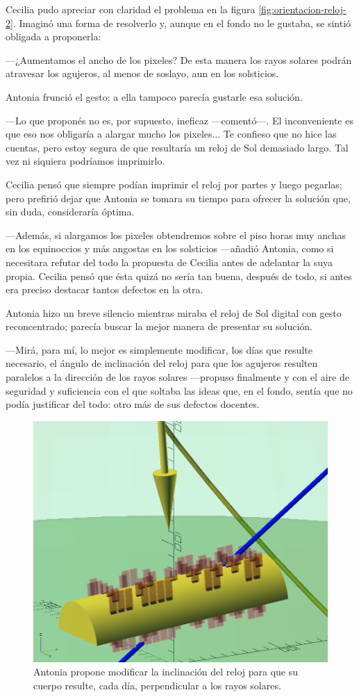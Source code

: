 Cecilia pudo apreciar con claridad el problema en la figura
\ref{fig:orientacion-reloj-2}. Imaginó una forma de resolverlo y, aunque
en el fondo no le gustaba, se sintió obligada a proponerla:

---¿Aumentamos el ancho de los pixeles? De esta manera los rayos
solares podrán atravesar los agujeros, al menos de soslayo, aun en los
solsticios.

Antonia frunció el gesto; a ella tampoco parecía gustarle esa
solución.

---Lo que proponés no es, por supuesto, ineficaz ---co\-men\-tó---. El
inconveniente es que eso nos obligaría a alargar mucho los
pixeles... Te confieso que no hice las cuentas, pero estoy segura de
que resultaría un reloj de Sol demasiado largo. Tal vez ni siquiera
podríamos imprimirlo.

Cecilia pensó que siempre podían imprimir el reloj por partes y luego
pegarlas; pero prefirió dejar que Antonia se tomara su tiempo para
ofrecer la solución que, sin duda, consideraría óptima.

---Además, si alargamos los pixeles obtendremos sobre el piso horas
muy anchas en los equinoccios y más angostas en los solsticios
---a\-ña\-dió Antonia, como si necesitara refutar del todo la
propuesta de Cecilia antes de adelantar la suya propia. Cecilia pensó
que ésta quizá no sería tan buena, después de todo, si antes era
preciso destacar tantos defectos en la otra.

Antonia hizo un breve silencio mientras miraba el reloj de Sol digital
con gesto reconcentrado; parecía buscar la mejor manera de presentar
su solución. 

---Mirá, para mí, lo mejor es simplemente modificar, los días que
resulte necesario, el ángulo de inclinación del reloj para que los
agujeros resulten paralelos a la dirección de los rayos solares
---propuso finalmente y con el aire de seguridad y suficiencia con el
que soltaba las ideas que, en el fondo, sentía que no podía justificar
del todo: otro más de sus defectos docentes.

\begin{figure}[ht]
  \centering
  \includegraphics[width=.5\textwidth]{imagenes/reorientacion-reloj-solsticio-zoom.png}
  \caption{Antonia propone modificar la inclinación del reloj para que
    su cuerpo resulte, cada día, perpendicular a los rayos solares.}
  \label{fig:reorientacion-reloj}
\end{figure}

